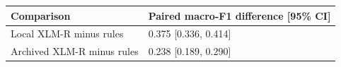\begin{tabular}{ll}
\toprule
Comparison & Paired macro-F1 difference [95\% CI] \\
\midrule
Local XLM-R minus rules & 0.375 [0.336, 0.414] \\
Archived XLM-R minus rules & 0.238 [0.189, 0.290] \\
\bottomrule
\end{tabular}
